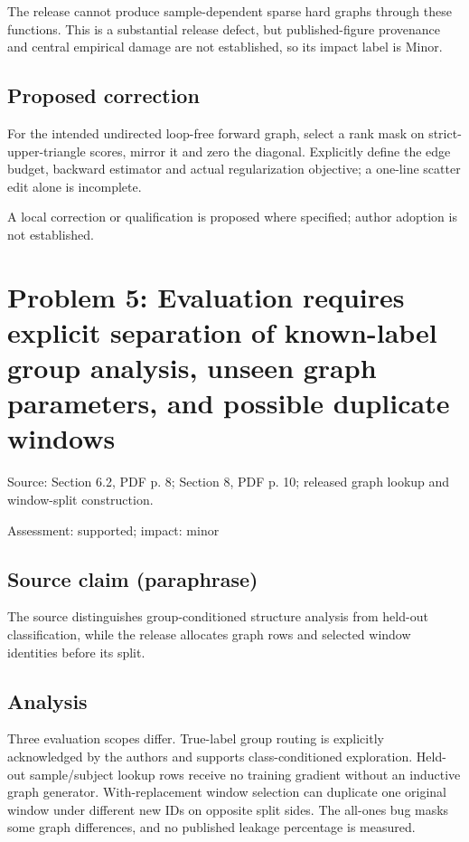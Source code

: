 \documentclass[11pt]{article}
\begin{document}
The release cannot produce sample-dependent sparse hard graphs through these functions. This is a substantial release defect, but published-figure provenance and central empirical damage are not established, so its impact label is Minor.

\subsection*{Proposed correction}

For the intended undirected loop-free forward graph, select a rank mask on strict-upper-triangle scores, mirror it and zero the diagonal. Explicitly define the edge budget, backward estimator and actual regularization objective; a one-line scatter edit alone is incomplete.

A local correction or qualification is proposed where specified; author adoption is not established.

\section*{Problem 5: Evaluation requires explicit separation of known-label group analysis, unseen graph parameters, and possible duplicate windows}

Source: Section 6.2, PDF p. 8; Section 8, PDF p. 10; released graph lookup and window-split construction.

Assessment: supported; impact: minor

\subsection*{Source claim (paraphrase)}

The source distinguishes group-conditioned structure analysis from held-out classification, while the release allocates graph rows and selected window identities before its split.

\subsection*{Analysis}

Three evaluation scopes differ. True-label group routing is explicitly acknowledged by the authors and supports class-conditioned exploration. Held-out sample/subject lookup rows receive no training gradient without an inductive graph generator. With-replacement window selection can duplicate one original window under different new IDs on opposite split sides. The all-ones bug masks some graph differences, and no published leakage percentage is measured.
\end{document}
